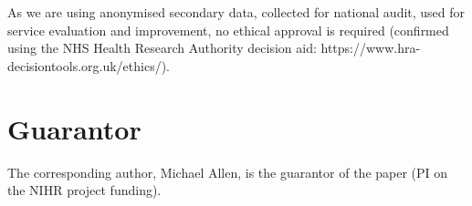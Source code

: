 As we are using anonymised secondary data, collected for national audit, used for service evaluation and improvement, no ethical approval is required (confirmed using the NHS Health Research Authority decision aid: https://www.hra-decisiontools.org.uk/ethics/).

\section*{Guarantor}

The corresponding author, Michael Allen, is the guarantor of the paper (PI on the NIHR project funding).

